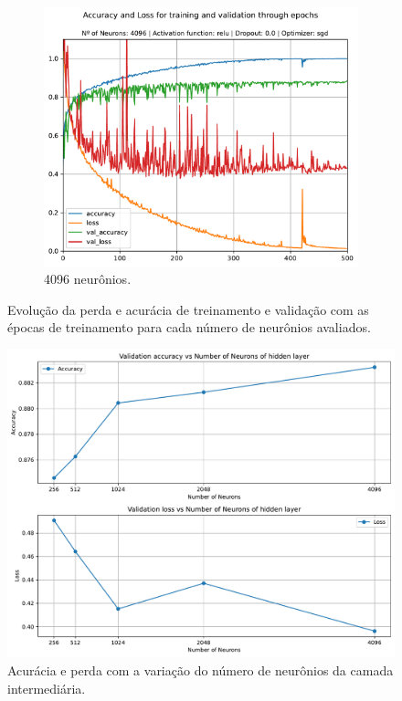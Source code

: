\begin{figure}[H]
\begin{subfigure}[H]{0.49\textwidth}
	\end{subfigure}
	\begin{subfigure}[H]{0.49\textwidth}
		\centering
		\includegraphics[width = \textwidth]{../../plot/mlp/mlp_4096_relu_0.0_sgd}
		\caption{4096 neurônios.}
		\label{fig:mlp_4096_relu_0.0_sgd}
	\end{subfigure}
	\caption{Evolução da perda e acurácia de treinamento e validação com as épocas de treinamento para cada número de neurônios avaliados.}
\end{figure}


\begin{figure}[H]
	\centering
	\includegraphics[width=0.75\linewidth]{../../plot/mlp/search_neurons}
	\caption{Acurácia e perda com a variação do número de neurônios da camada intermediária.}
	\label{fig:search_neurons}
\end{figure}


